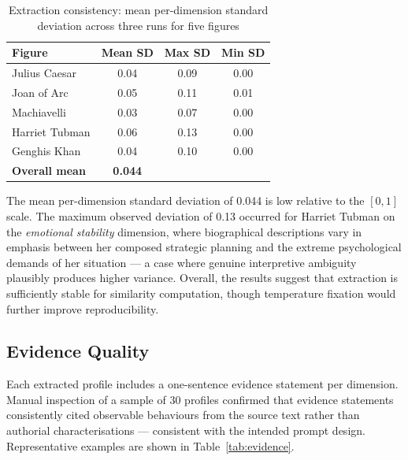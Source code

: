 \documentclass[11pt, a4paper]{report}
\begin{document}
\begin{table}[H]
  \centering
  \caption{Extraction consistency: mean per-dimension standard deviation across three runs for five figures}
  \label{tab:consistency}
  \begin{tabular}{lccc}
    \toprule
    Figure & Mean SD & Max SD & Min SD \\
    \midrule
    Julius Caesar & 0.04 & 0.09 & 0.00 \\
    Joan of Arc & 0.05 & 0.11 & 0.01 \\
    Machiavelli & 0.03 & 0.07 & 0.00 \\
    Harriet Tubman & 0.06 & 0.13 & 0.00 \\
    Genghis Khan & 0.04 & 0.10 & 0.00 \\
    \midrule
    \textbf{Overall mean} & \textbf{0.044} & & \\
    \bottomrule
  \end{tabular}
\end{table}

The mean per-dimension standard deviation of 0.044 is low relative to the $[0,1]$ scale. The maximum observed deviation of 0.13 occurred for Harriet Tubman on the \textit{emotional stability} dimension, where biographical descriptions vary in emphasis between her composed strategic planning and the extreme psychological demands of her situation — a case where genuine interpretive ambiguity plausibly produces higher variance. Overall, the results suggest that extraction is sufficiently stable for similarity computation, though temperature fixation would further improve reproducibility.

\subsection{Evidence Quality}

Each extracted profile includes a one-sentence evidence statement per dimension. Manual inspection of a sample of 30 profiles confirmed that evidence statements consistently cited observable behaviours from the source text rather than authorial characterisations — consistent with the intended prompt design. Representative examples are shown in Table~\ref{tab:evidence}.
\end{document}
